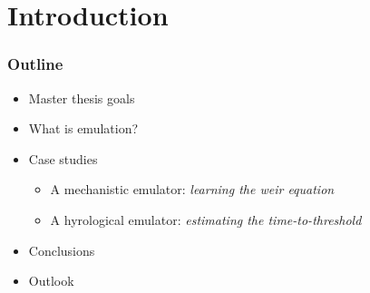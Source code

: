 \documentclass[xcolor=dvipsnames, USenglish]{beamer}  %
\begin{document}
\section{Introduction}

  \begin{frame}
    \frametitle{Outline}
    \begin{itemize}
      \item Master thesis goals
      \item What is emulation?
      \item Case studies
      \begin{itemize}
        \item A mechanistic emulator: \emph{learning the weir equation}
        \item A hyrological emulator: \emph{estimating the time-to-threshold}
      \end{itemize}
      \item Conclusions
      \item Outlook
     \end{itemize}
  \end{frame}
\end{document}
